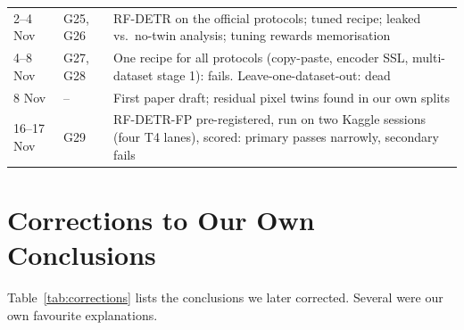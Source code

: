 \begin{table}[!htbp]
\begin{tabularx}{\textwidth}{@{}l l X@{}}
2--4 Nov & G25, G26 & RF-DETR on the official protocols; tuned recipe; leaked vs.\ no-twin analysis; tuning rewards memorisation \\
4--8 Nov & G27, G28 & One recipe for all protocols (copy-paste, encoder SSL, multi-dataset stage 1): fails. Leave-one-dataset-out: dead \\
8 Nov & -- & First paper draft; residual pixel twins found in our own splits \\
16--17 Nov & G29 & RF-DETR-FP pre-registered, run on two Kaggle sessions (four T4 lanes), scored: primary passes narrowly, secondary fails \\
\bottomrule
\end{tabularx}
\end{table}

\section{Corrections to Our Own Conclusions}
\label{app:corrections}
Table~\ref{tab:corrections} lists the conclusions we later corrected. Several were our own favourite explanations.

